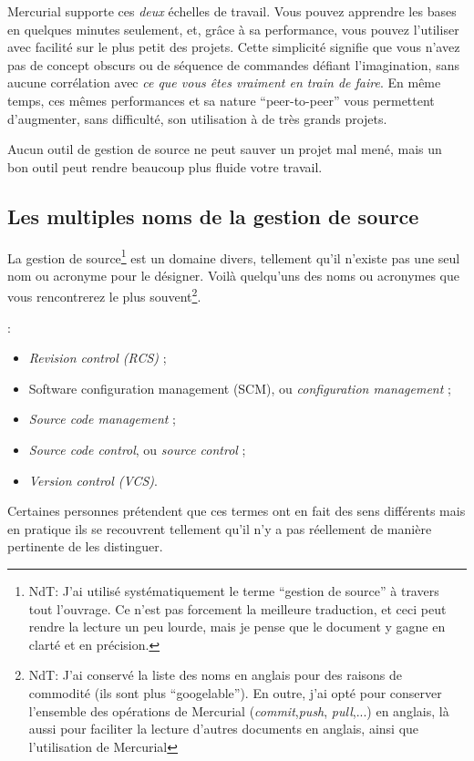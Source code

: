 Mercurial supporte ces \emph{deux} échelles de travail. Vous pouvez apprendre
les bases en quelques minutes seulement, et, grâce à sa performance, vous pouvez
l'utiliser avec facilité sur le plus petit des projets. Cette simplicité 
signifie que vous n'avez pas de concept obscurs ou de séquence de commandes
défiant l'imagination, sans aucune corrélation avec \emph{ce que vous êtes 
vraiment en train de faire}. En même temps, ces mêmes performances et sa 
nature ``peer-to-peer'' vous permettent d'augmenter, sans difficulté, son 
utilisation à de très grands projets.

Aucun outil de gestion de source ne peut sauver un projet mal mené, mais un
bon outil peut rendre beaucoup plus fluide votre travail.

\subsection{Les multiples noms de la gestion de source}

La gestion de source\footnote{NdT: J'ai utilisé systématiquement le terme
``gestion de source'' à travers tout l'ouvrage. Ce n'est pas forcement la
meilleure traduction, et ceci peut rendre la lecture un peu lourde, mais je
pense que le document y gagne en clarté et en précision.} est un domaine
divers, tellement qu'il n'existe pas une seul nom ou acronyme pour le désigner.
Voilà quelqu'uns des noms ou 
acronymes que vous rencontrerez le plus souvent\footnote{NdT: J'ai conservé la
liste des noms en anglais pour des raisons de commodité (ils sont plus
``googelable''). En outre, j'ai opté  pour conserver l'ensemble des opérations de
Mercurial (\textit{commit},\textit{push}, \textit{pull},...) en anglais, là
aussi pour faciliter la lecture d'autres documents en anglais, ainsi que
l'utilisation de Mercurial}.

:
\begin{itemize}
\item \textit{Revision control (RCS)} ;
\item Software configuration management (SCM), ou \textit{configuration management} ;
\item \textit{Source code management} ;
\item \textit{Source code control}, ou \textit{source control} ;
\item \textit{Version control (VCS)}.
\end{itemize}

Certaines personnes prétendent que ces termes ont en fait des sens
différents mais en pratique ils se recouvrent tellement qu'il n'y a pas
réellement de manière pertinente de les distinguer.

